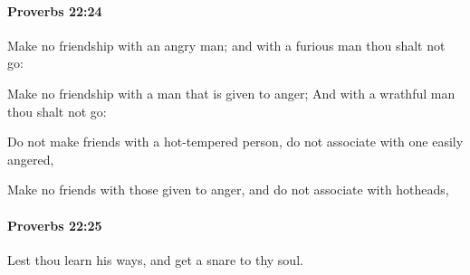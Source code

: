 		\paragraph{Proverbs 22:24} %
			\label{PROVERBS-22-24}

			Make no friendship with an angry man; and with a furious man thou shalt not go:

			\begin{versebox}
					\item[BHS] 
					\item[ASV] Make no friendship with a man that is given to anger; And with a wrathful man thou shalt not go:
					\item[NIV] Do not make friends with a hot-tempered person, do not associate with one easily angered,
					\item[NRSV] Make no friends with those given to anger, and do not associate with hotheads,
			\end{versebox}

		\paragraph{Proverbs 22:25} %
			\label{PROVERBS-22-25}

			Lest thou learn his ways, and get a snare to thy soul.

